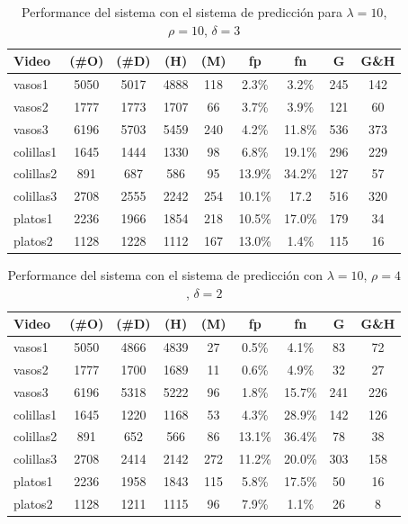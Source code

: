 \begin{table}[htb]
  \begin{tabular}{|l | c | c | c | c | c | c | c | c |}
	\hline  
	\textbf{Video} & \textbf{(\#O)} &  \textbf{(\#D)} & \textbf{(H)} & \textbf{(M)} & \textbf{fp} & \textbf{fn} & \textbf{G} & \textbf{G\&H} \\
	\hline
	\hline
	vasos1 & 5050 & 5017 & 4888 & 118 & 2.3\% & 3.2\%  & 245 & 142\\
	vasos2 & 1777 & 1773 & 1707 & 66 & 3.7\% & 3.9\% & 121 & 60 \\
	vasos3 & 6196 & 5703 & 5459 & 240 & 4.2\% & 11.8\% & 536 & 373 \\
	\hline
	colillas1 & 1645 & 1444 & 1330 & 98 & 6.8\% & 19.1\% & 296 & 229 \\
	colillas2 & 891 & 687 & 586 & 95 & 13.9\% & 34.2\% & 127 & 57 \\
	colillas3 & 2708 & 2555 & 2242 & 254 & 10.1\% & 17.2  & 516 & 320\\
	\hline
	platos1 & 2236 & 1966 & 1854 & 218 & 10.5\% & 17.0\% & 179 & 34\\
	platos2 & 1128 & 1228 & 1112 & 167& 13.0\% & 1.4\% & 115 & 16\\
	\hline
	\end{tabular}
	\caption[Performance con sistema de predicci\'on configuraci\'on 1]{\label{tab:pred} Performance del sistema con el sistema de predicci\'on para 
	$\lambda=10$, $\rho=10$, $\delta=3$ }
\end{table}

\begin{table}[htb]
  \begin{tabular}{|l | c | c | c | c | c | c | c | c |}
	\hline  
	\textbf{Video} & \textbf{(\#O)} &  \textbf{(\#D)} & \textbf{(H)} & \textbf{(M)} & \textbf{fp} & \textbf{fn} & \textbf{G} & \textbf{G\&H} \\
	\hline
	\hline
	vasos1 & 5050 & 4866 & 4839 & 27 & 0.5\% & 4.1\%  & 83 & 72\\
	vasos2 & 1777 & 1700 & 1689 & 11 & 0.6\% & 4.9\% & 32 & 27 \\
	vasos3 & 6196 & 5318 & 5222 & 96 & 1.8\% & 15.7\% & 241 & 226 \\
	\hline
	colillas1 & 1645 & 1220 & 1168 & 53 & 4.3\% & 28.9\% & 142 & 126 \\
	colillas2 & 891 & 652 & 566 & 86 & 13.1\% & 36.4\% & 78 & 38 \\
	colillas3 & 2708 & 2414 & 2142 & 272 & 11.2\% & 20.0\% & 303 & 158 \\
	\hline
	platos1 & 2236 & 1958 & 1843 & 115 & 5.8\% & 17.5\% & 50 & 16 \\
	platos2 & 1128 & 1211 & 1115 & 96 & 7.9\% & 1.1\% & 26 & 8 \\
	\hline
	\end{tabular}
	\caption[Performance con sistema de predicci\'on configuraci\'on 2]{\label{tab:pred_2} Performance del sistema con el sistema de predicci\'on con
	$\lambda=10$, $\rho=4$, $\delta=2$}
\end{table}

